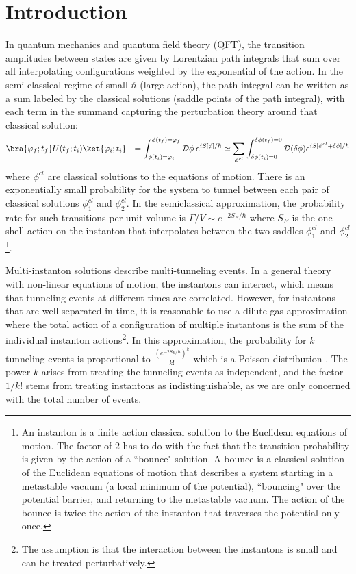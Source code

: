 \documentclass[a4paper,11pt]{article}
\theoremstyle{definition}
\numberwithin{equation}{section}
\newcommand{\NL}[1]{\textcolor{blue}{#1}}
\begin{document}
\section{Introduction}


In quantum mechanics and quantum field theory (QFT), the transition amplitudes between states are given by Lorentzian path integrals that sum over all interpolating configurations weighted by the exponential of the action. In the semi-classical regime of small $\hbar$ (large action), the path integral can be written as a sum labeled by the classical solutions (saddle points of the path integral), with each term in the summand capturing the perturbation theory around that classical solution:
\begin{eqnarray}
    \bra{\varphi_f;t_f}U(t_f;t_i)\ket{\varphi_i;t_i}&&=\int_{\phi(t_i)=\varphi_i}^{\phi(t_f)=\varphi_f}\mathcal{D}\phi\: e^{i S[\phi]/\hbar}\simeq \sum_{\phi^{cl}} \int_{\delta\phi(t_i)=0}^{\delta\phi(t_f)=0} \mathcal{D}(\delta \phi) e^{i S[\phi^{cl}+\delta \phi]/\hbar}
\end{eqnarray}
where $\phi^{cl}$ are classical solutions to the equations of motion.
There is an exponentially small probability for the system to tunnel between each pair of classical solutions $\phi^{cl}_1$ and $\phi^{cl}_2$. In the semiclassical approximation, the probability rate for such transitions per unit volume is $\Gamma/V\sim e^{-2S_E/\hbar}$ where $S_E$ is the one-shell action on the instanton that interpolates between the two saddles $\phi^{cl}_1$ and $\phi^{cl}_2$  \cite{coleman1977fate,callan1977fate} \footnote{An instanton is a finite action classical solution to the Euclidean equations of motion. The factor of $2$ has to do with the fact that the transition probability is given by the action of a ``bounce" solution. A bounce is a classical solution of the Euclidean equations of motion that describes a system starting in a metastable vacuum (a local minimum of the potential), ``bouncing" over the potential barrier, and returning to the metastable vacuum. The action of the bounce is twice the action of the instanton that traverses the potential only once.}.


Multi-instanton solutions describe multi-tunneling events. In a general theory with non-linear equations of motion, the instantons can interact, which means that tunneling events at different times are correlated. However, for instantons that are well-separated in time, it is reasonable to use a dilute gas approximation where the total action of a configuration of multiple instantons is the sum of the individual instanton actions\footnote{The assumption is that the interaction between the instantons is small and can be treated perturbatively.}. In this approximation, the probability for $k$ tunneling events is proportional to 
$\frac{(e^{-2S_E/\hbar})^k}{k!}$ which is a Poisson distribution \cite{coleman1988aspects}. The power $k$ arises from treating the tunneling events as independent, and the factor $1/k!$ stems from treating instantons as indistinguishable, as we are only concerned with the total number of events.
\end{document}
